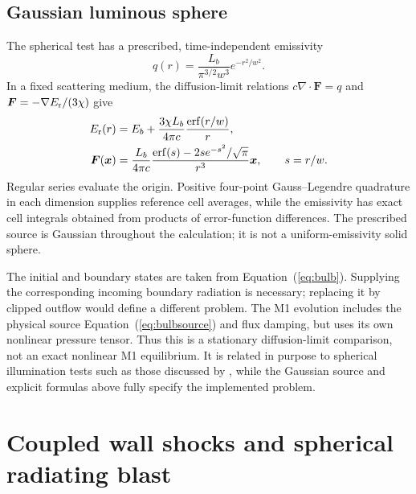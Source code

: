 \documentclass[manuscript]{aastex7}
\newcommand{\vct}[1]{\boldsymbol{#1}}
\newcommand{\Er}{E_{\rm r}}
\newcommand{\Fr}{\vct{F}}
\begin{document}
\subsection{Gaussian luminous sphere}
The spherical test has a prescribed, time-independent emissivity
\begin{equation}
 q(r)=\frac{L_b}{\pi^{3/2}w^3}e^{-r^2/w^2}.
 \label{eq:bulbsource}
\end{equation}
In a fixed scattering medium, the diffusion-limit relations
$c\nabla\cdot\Fr=q$ and $\Fr=-\nabla\Er/(3\chi)$ give
\begin{align}
 \Er(r)&=E_b+\frac{3\chi L_b}{4\pi c}
                      \frac{\operatorname{erf}(r/w)}{r},\\
 \Fr(\vct{x})&=\frac{L_b}{4\pi c}
 \frac{\operatorname{erf}(s)-2s e^{-s^2}/\sqrt{\pi}}{r^3}
 \vct{x},\qquad s=r/w.
 \label{eq:bulb}
\end{align}
Regular series evaluate the origin. Positive four-point Gauss--Legendre
quadrature in each dimension supplies reference cell averages, while
the emissivity has exact cell integrals obtained from products of
error-function differences. The prescribed source is Gaussian throughout
the calculation; it is not a uniform-emissivity solid sphere.

The initial and boundary states are taken from
Equation~(\ref{eq:bulb}). Supplying the corresponding incoming boundary
radiation is necessary; replacing it by clipped outflow would define a
different problem. The M1 evolution includes the physical source
Equation~(\ref{eq:bulbsource}) and flux damping, but uses its own nonlinear
pressure tensor. Thus this is a stationary diffusion-limit comparison,
not an exact nonlinear M1 equilibrium. It is related in purpose to
spherical illumination tests such as those discussed by
\citet{Ensman1994}, while the Gaussian source and explicit formulas above
fully specify the implemented problem.

\section{Coupled wall shocks and spherical radiating blast}
\end{document}
